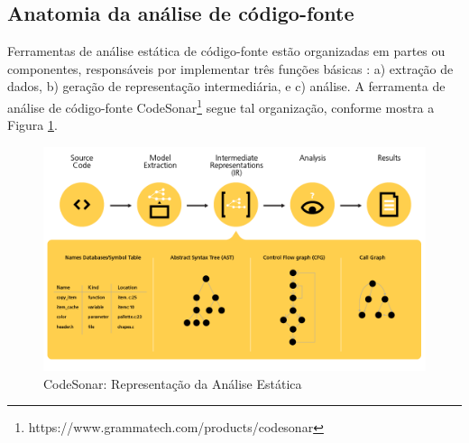 \subsection{Anatomia da análise de código-fonte} \label{anatomia}

Ferramentas de análise estática de código-fonte estão organizadas em partes ou
componentes, responsáveis por implementar três funções básicas \cite{Cruz2009, Binkley2007}: a) extração de dados, b) geração de representação
intermediária, e c) análise. A ferramenta de análise de código-fonte
CodeSonar\footnote{https://www.grammatech.com/products/codesonar} segue tal
organização, conforme mostra a Figura \ref{static-analysis-representation}.

\begin{figure}[h]
  \center
  \includegraphics[scale=0.4]{imagens/static-analysis-representation.png}
  \caption{CodeSonar: Representação da Análise Estática \cite{GrammaTech2016}}
  \label{static-analysis-representation}
\end{figure}

